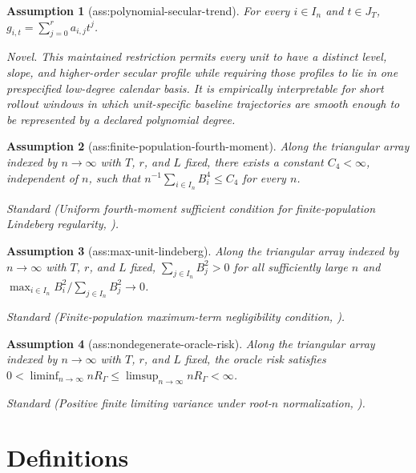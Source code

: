 \documentclass{article}
\newtheorem{assumption}{Assumption}
\begin{document}
\begin{assumption}[ass:polynomial-secular-trend]\label{ass:polynomial-secular-trend}
For every \(i\in I_n\) and \(t\in J_T\), \(g_{i,t}=\sum_{j=0}^{r}a_{i,j}t^j\).
\par\smallskip\noindent\emph{Novel.} This maintained restriction permits every unit to have a distinct level, slope, and higher-order secular profile while requiring those profiles to lie in one prespecified low-degree calendar basis. It is empirically interpretable for short rollout windows in which unit-specific baseline trajectories are smooth enough to be represented by a declared polynomial degree.
\end{assumption}

\begin{assumption}[ass:finite-population-fourth-moment]\label{ass:finite-population-fourth-moment}
Along the triangular array indexed by \(n\to\infty\) with \(T\), \(r\), and \(L\) fixed, there exists a constant \(C_4<\infty\), independent of \(n\), such that \(n^{-1}\sum_{i\in I_n}B_i^4\le C_4\) for every \(n\).
\par\smallskip\noindent\emph{Standard} (Uniform fourth-moment sufficient condition for finite-population Lindeberg regularity, \cite{LiDing2017}).
\end{assumption}

\begin{assumption}[ass:max-unit-lindeberg]\label{ass:max-unit-lindeberg}
Along the triangular array indexed by \(n\to\infty\) with \(T\), \(r\), and \(L\) fixed, \(\sum_{j\in I_n}B_j^2>0\) for all sufficiently large \(n\) and \(\max_{i\in I_n}B_i^2/\sum_{j\in I_n}B_j^2\to0\).
\par\smallskip\noindent\emph{Standard} (Finite-population maximum-term negligibility condition, \cite{LiDing2017}).
\end{assumption}

\begin{assumption}[ass:nondegenerate-oracle-risk]\label{ass:nondegenerate-oracle-risk}
Along the triangular array indexed by \(n\to\infty\) with \(T\), \(r\), and \(L\) fixed, the oracle risk satisfies \(0<\liminf_{n\to\infty}nR_\Gamma\le\limsup_{n\to\infty}nR_\Gamma<\infty\).
\par\smallskip\noindent\emph{Standard} (Positive finite limiting variance under root-\(n\) normalization, \cite{LiDing2017}).
\end{assumption}

\section{Definitions}
\end{document}
